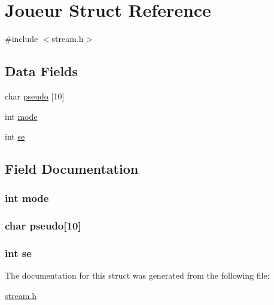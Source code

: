 \hypertarget{struct_joueur}{}\section{Joueur Struct Reference}
\label{struct_joueur}


{\ttfamily \#include $<$stream.\+h$>$}

\subsection*{Data Fields}
\begin{DoxyCompactItemize}
\item 
char \hyperlink{struct_joueur_ac8e9179672836cd220547853402bf178}{pseudo} \mbox{[}10\mbox{]}
\item 
int \hyperlink{struct_joueur_a1ea5d0cb93f22f7d0fdf804bd68c3326}{mode}
\item 
int \hyperlink{struct_joueur_a0c38adef1c309a145b4179ce607df167}{se}
\end{DoxyCompactItemize}


\subsection{Field Documentation}
\hypertarget{struct_joueur_a1ea5d0cb93f22f7d0fdf804bd68c3326}{}
\subsubsection[{mode}]{\setlength{\rightskip}{0pt plus 5cm}int mode}\label{struct_joueur_a1ea5d0cb93f22f7d0fdf804bd68c3326}
\hypertarget{struct_joueur_ac8e9179672836cd220547853402bf178}{}
\subsubsection[{pseudo}]{\setlength{\rightskip}{0pt plus 5cm}char pseudo\mbox{[}10\mbox{]}}\label{struct_joueur_ac8e9179672836cd220547853402bf178}
\hypertarget{struct_joueur_a0c38adef1c309a145b4179ce607df167}{}
\subsubsection[{se}]{\setlength{\rightskip}{0pt plus 5cm}int se}\label{struct_joueur_a0c38adef1c309a145b4179ce607df167}


The documentation for this struct was generated from the following file\+:\begin{DoxyCompactItemize}
\item 
\hyperlink{stream_8h}{stream.\+h}\end{DoxyCompactItemize}
